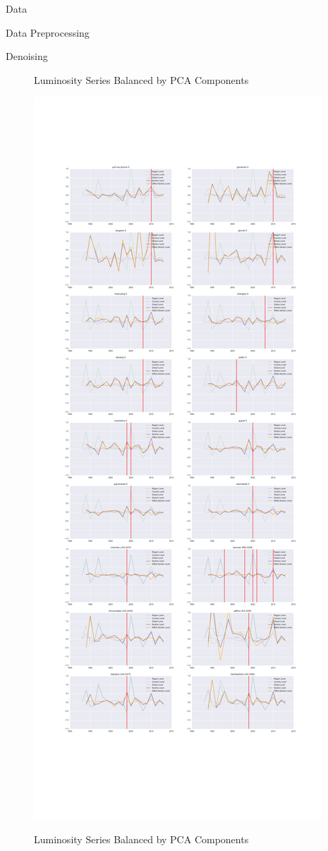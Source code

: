 \documentclass[12pt,fleqn,leqno,letterpaper]{article}
\begin{document}
\begin{section}{Data}
\begin{subsection}{Data Preprocessing}
\begin{subsubsection}{Denoising}
\begin{figure}[t!]
        \caption{Luminosity Series Balanced by PCA Components}
      \end{figure}
      \begin{figure}[t!]
        \centering
        \includegraphics[width=1\linewidth]{pca_balancer_diffs}\label{fig:pca_balanced_luminosity_sum_series} %
        \caption{Luminosity Series Balanced by PCA Components}
      \end{figure}
    \end{subsubsection}
  \end{subsection}
\end{section}
\end{document}
